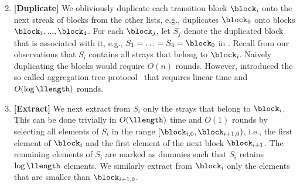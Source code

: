 

\begin{enumerate}
\setcounter{enumi}{1}
    \item \label{highlevelapproach2} \textbf{[Duplicate]} We obliviously duplicate each transition block $\block_i$ onto the next streak of blocks from the other lists, e.g.,  duplicates $\block_0$ onto blocks $\block_1,...,\block_4$. For each $\block_j$, let $S_j$ denote the duplicated block that is associated with it, e.g., $S_{1}=\ldots=S_{4}=\block_0$ in . Recall from our observations that $S_i$ contains all strays that belong to $\block_i$. Naively duplicating the blocks would require $O(n)$ rounds. However, \cite{CCS:BDGRR22} introduced the so called aggregation tree protocol \aggtreeprotocol\ that requires linear time and $O(\log\llength)$ rounds. 
    \item \label{highlevelapproach3}\textbf{[Extract]} We next extract from $S_i$ only the strays that belong to $\block_i$. This can be done trivially in $O(\llength)$ time and $O(1)$ rounds by selecting all elements of $S_i$ in the range $[\block_{i,0}, \block_{i+1,0})$, i.e., the first element of $\block_i$ and the first element of the next block $\block_{i+1}$. The remaining elements of $S_i$ are marked as dummies such that $S_i$ retains $\log\llength$ elements. We similarly extract from $\block_i$ only the elements that are smaller than $\block_{i+1,0}$.
\end{enumerate}

